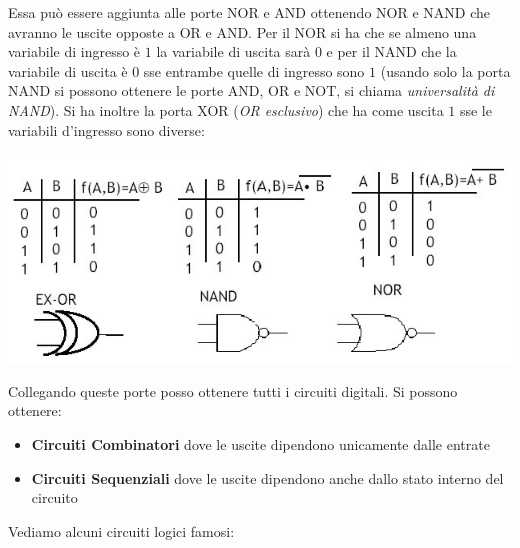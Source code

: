\documentclass[a4paper,12pt, oneside]{book}
\begin{document}
\begin{itemize}
Essa può essere aggiunta alle porte NOR e AND ottenendo NOR e NAND che avranno le uscite opposte a OR e AND. Per il NOR si ha che se almeno una variabile di ingresso è $1$ la variabile di uscita sarà $0$ e per il NAND che la variabile di uscita è $0$ sse entrambe quelle di ingresso sono $1$ (usando solo la porta NAND si possono ottenere le porte AND, OR e NOT, si chiama \textit{universalità di NAND}). Si ha inoltre la porta XOR (\textit{OR esclusivo}) che ha come uscita $1$ sse le variabili d'ingresso sono diverse:\\
\\
\includegraphics[scale=0.57]{img/nornand.jpg}\\
\end{itemize}
Collegando queste porte posso ottenere tutti i circuiti digitali. Si possono ottenere:
\begin{itemize}
\item \textbf{Circuiti Combinatori} dove le uscite dipendono unicamente dalle entrate
\item \textbf{Circuiti Sequenziali} dove le uscite dipendono anche dallo stato interno del circuito
\end{itemize}
\newpage
Vediamo alcuni circuiti logici famosi:
\end{document}
